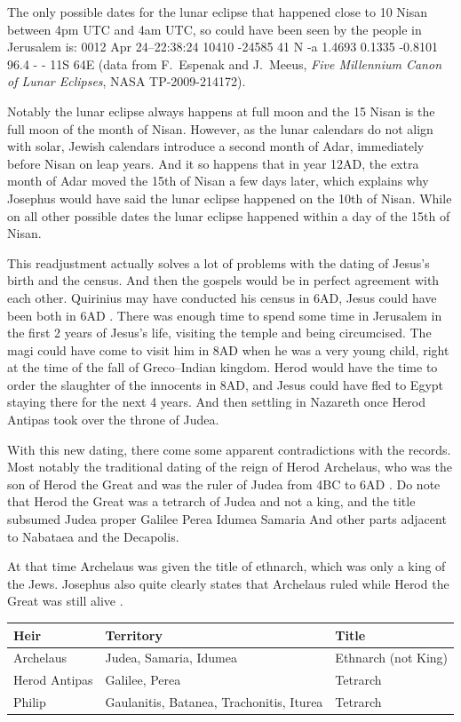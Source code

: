 The only possible dates for the lunar eclipse that happened close to 10 Nisan between 4pm UTC and 4am UTC, so could have been seen by the people in Jerusalem is: 0012 Apr 24--22:38:24 10410 -24585 41 N -a 1.4693 0.1335 -0.8101 96.4 - - 11S 64E (data from F.~Espenak and J.~Meeus, \emph{Five Millennium Canon of Lunar Eclipses}, NASA TP-2009-214172).

Notably the lunar eclipse always happens at full moon and the 15 Nisan is the full moon of the month of Nisan.
However, as the lunar calendars do not align with solar, Jewish calendars introduce a second month of Adar, immediately before Nisan on leap years.
And it so happens that in year 12AD, the extra month of Adar moved the 15th of Nisan a few days later, which explains why Josephus would have said the lunar eclipse happened on the 10th of Nisan.
While on all other possible dates the lunar eclipse happened within a day of the 15th of Nisan.

This readjustment actually solves a lot of problems with the dating of Jesus's birth and the census.
And then the gospels would be in perfect agreement with each other.
Quirinius may have conducted his census in 6AD, Jesus could have been both in 6AD .
There was enough time to spend some time in Jerusalem in the first 2 years of Jesus's life, visiting the temple and being circumcised.
The magi could have come to visit him in 8AD when he was a very young child, right at the time of the fall of Greco--Indian kingdom.
Herod would have the time to order the slaughter of the innocents in 8AD, and Jesus could have fled to Egypt staying there for the next 4 years.
And then settling in Nazareth once Herod Antipas took over the throne of Judea.

With this new dating, there come some apparent contradictions with the records.
Most notably the traditional dating of the reign of Herod Archelaus, who was the son of Herod the Great and was the ruler of Judea from 4BC to 6AD .
Do note that Herod the Great was a tetrarch of Judea and not a king, and the title subsumed Judea proper Galilee Perea Idumea Samaria And other parts adjacent to Nabataea and the Decapolis.

At that time Archelaus was given the title of ethnarch, which was only a king of the Jews.
Josephus also quite clearly states that Archelaus ruled while Herod the Great was still alive \cite[17.229--249]{josephus:ant}.

\begin{center}
\begin{tabular}{@{}lll@{}}
\toprule
\textbf{Heir} & \textbf{Territory} & \textbf{Title} \\
\midrule
Archelaus & Judea, Samaria, Idumea & Ethnarch (not King) \\
Herod Antipas & Galilee, Perea & Tetrarch \\
Philip & Gaulanitis, Batanea, Trachonitis, Iturea & Tetrarch \\
\bottomrule
\end{tabular}
\end{center}

